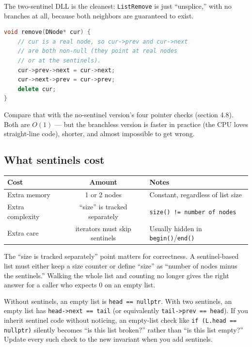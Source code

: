 \documentclass[11pt]{article}
\begin{document}
The two-sentinel DLL is the cleanest: \texttt{ListRemove} is just
``unsplice,'' with no branches at all, because both neighbors are
guaranteed to exist.

\begin{examplebox}
\begin{lstlisting}[language=C++,basicstyle=\ttfamily\small,frame=single]
void remove(DNode* cur) {
    // cur is a real node, so cur->prev and cur->next
    // are both non-null (they point at real nodes
    // or at the sentinels).
    cur->prev->next = cur->next;
    cur->next->prev = cur->prev;
    delete cur;
}
\end{lstlisting}
\end{examplebox}

Compare that with the no-sentinel version's four pointer checks
(section 4.8). Both are $O(1)$ --- but the branchless version is
faster in practice (the CPU loves straight-line code), shorter,
and almost impossible to get wrong.

\subsection*{What sentinels cost}

\begin{center}
\begin{tabular}{|l|c|l|}
\hline
\textbf{Cost} & \textbf{Amount} & \textbf{Notes} \\
\hline
Extra memory     & 1 or 2 nodes & Constant, regardless of list size \\
Extra complexity & ``size'' is tracked separately & \texttt{size() != number of nodes} \\
Extra care       & iterators must skip sentinels & Usually hidden in \texttt{begin()}/\texttt{end()} \\
\hline
\end{tabular}
\end{center}

The ``size is tracked separately'' point matters for correctness.
A sentinel-based list must either keep a size counter or define
``size'' as ``number of nodes minus the sentinels.'' Walking the
whole list and counting no longer gives the right answer for a
caller who expects 0 on an empty list.

\begin{warnbox}
Without sentinels, an empty list is \texttt{head == nullptr}. With
two sentinels, an empty list has \texttt{head->next == tail} (or
equivalently \texttt{tail->prev == head}). If you inherit sentinel
code without noticing, an empty-list check like
\texttt{if (L.head == nullptr)} silently becomes ``is this list
broken?'' rather than ``is this list empty?'' Update every such
check to the new invariant when you add sentinels.
\end{warnbox}
\end{document}
